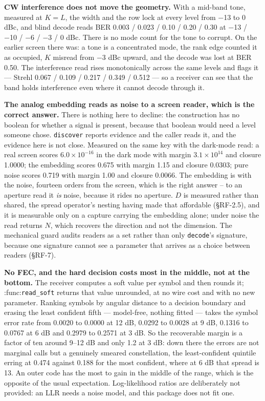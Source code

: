 \documentclass[10pt,letterpaper,twocolumn]{article}
\begin{document}
\textbf{CW interference does not move the geometry.} With a mid-band tone, measured at \(K = L\), the width and the row lock at every level from −13 to 0 dBc, and blind decode reads BER 0.003 / 0.023 / 0.10 / 0.20 / 0.30 at −13 / −10 / −6 / −3 / 0 dBc. There is no mode count for the tone to corrupt. On the earlier screen there was: a tone is a concentrated mode, the rank edge counted it as occupied, \(K\) misread from −3 dBc upward, and the decode was lost at BER 0.50. The interference read rises monotonically across the same levels and flags it --- Strehl 0.067 / 0.109 / 0.217 / 0.349 / 0.512 --- so a receiver can see that the band holds interference even where it cannot decode through it.

\textbf{The analog embedding reads as noise to a screen reader, which is the correct answer.} There is nothing here to decline: the construction has no boolean for whether a signal is present, because that boolean would need a level someone chose. \texttt{discover} reports evidence and the caller reads it, and the evidence here is not close. Measured on the same key with the dark-mode read: a real screen scores \(6.0\times10^{-16}\) in the dark mode with margin \(3.1\times10^{14}\) and closure 1.0000; the embedding scores 0.675 with margin 1.15 and closure 0.0303; pure noise scores 0.719 with margin 1.00 and closure 0.0066. The embedding is with the noise, fourteen orders from the screen, which is the right answer -- to an aperture read it \emph{is} noise, because it rides no aperture. \(D\) is measured rather than shared, the spread operator's nesting having made that affordable (§RF-2.5), and it is measurable only on a capture carrying the embedding alone; under noise the read returns \(N\), which recovers the direction and not the dimension. The mechanical guard audits readers as a set rather than only \texttt{decode}'s signature, because one signature cannot see a parameter that arrives as a choice between readers (§RF-7).

\textbf{No FEC, and the hard decision costs most in the middle, not at the bottom.} The receiver computes a soft value per symbol and then rounds it; :func:\texttt{read\_\allowbreak{}soft} returns that value unrounded, at no wire cost and with no new parameter. Ranking symbols by angular distance to a decision boundary and erasing the least confident fifth --- model-free, nothing fitted --- takes the symbol error rate from 0.0020 to 0.0000 at 12 dB, 0.0292 to 0.0028 at 9 dB, 0.1316 to 0.0767 at 6 dB and 0.2979 to 0.2571 at 3 dB. So the recoverable margin is a factor of ten around 9--12 dB and only 1.2 at 3 dB: down there the errors are not marginal calls but a genuinely smeared constellation, the least-confident quintile erring at 0.474 against 0.188 for the most confident, where at 6 dB that spread is 13. An outer code has the most to gain in the middle of the range, which is the opposite of the usual expectation. Log-likelihood ratios are deliberately not provided: an LLR needs a noise model, and this package does not fit one.
\end{document}
